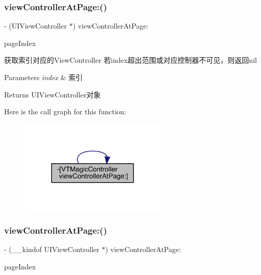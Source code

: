 \subsubsection{\texorpdfstring{view\+Controller\+At\+Page\+:()}{viewControllerAtPage:()}\hspace{0.1cm}{\footnotesize\ttfamily [1/3]}}
{\footnotesize\ttfamily -\/ (U\+I\+View\+Controller $\ast$) view\+Controller\+At\+Page\+: \begin{DoxyParamCaption}\item[{(N\+S\+U\+Integer)}]{page\+Index }\end{DoxyParamCaption}}

获取索引对应的\+View\+Controller 若index超出范围或对应控制器不可见，则返回nil


\begin{DoxyParams}{Parameters}
{\em index} & 索引\\
\hline
\end{DoxyParams}
\begin{DoxyReturn}{Returns}
U\+I\+View\+Controller对象 
\end{DoxyReturn}
Here is the call graph for this function\+:\nopagebreak
\begin{figure}[H]
\begin{center}
\leavevmode
\includegraphics[width=200pt]{interface_v_t_magic_controller_af1fc3321dd2ba20039f764b858a5492b_cgraph}
\end{center}
\end{figure}
\mbox{\label{interface_v_t_magic_controller_ac79d790a9883586d281782ceeb5d7ef3}} 
\subsubsection{\texorpdfstring{view\+Controller\+At\+Page\+:()}{viewControllerAtPage:()}\hspace{0.1cm}{\footnotesize\ttfamily [2/3]}}
{\footnotesize\ttfamily -\/ (\+\_\+\+\_\+kindof U\+I\+View\+Controller $\ast$) view\+Controller\+At\+Page\+: \begin{DoxyParamCaption}\item[{(N\+S\+U\+Integer)}]{page\+Index }\end{DoxyParamCaption}}

